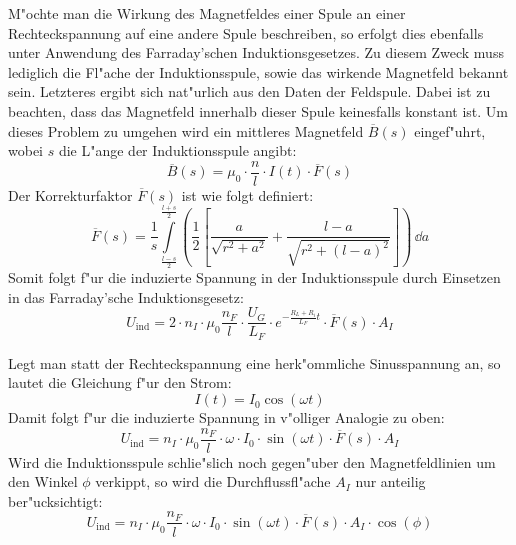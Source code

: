 \documentclass[a4paper,10pt]{article}
\begin{document}
M"ochte man die Wirkung des Magnetfeldes einer Spule an einer Rechteckspannung auf eine andere Spule beschreiben, so erfolgt dies ebenfalls unter Anwendung des Farraday'schen Induktionsgesetzes. Zu diesem Zweck muss lediglich die Fl"ache der Induktionsspule, sowie das wirkende Magnetfeld bekannt sein. Letzteres ergibt sich nat"urlich aus den Daten der Feldspule. Dabei ist zu beachten, dass das Magnetfeld innerhalb dieser Spule keinesfalls konstant ist. Um dieses Problem zu umgehen wird ein mittleres Magnetfeld $\overline{B}(s)$ eingef"uhrt, wobei $s$ die L"ange der Induktionsspule angibt:
\begin{equation}
\overline{B}(s) = \mu_0 \cdot \frac{n}{l} \cdot I(t) \cdot \overline{F}(s)
\end{equation}
Der Korrekturfaktor $\overline{F}(s)$ ist wie folgt definiert:
\begin{equation}
\overline{F}(s) = \frac{1}{s} \int \limits_{\frac{l-s}{2}}^{\frac{l+s}{2}} \left( \frac{1}{2} \left[ \frac{a}{\sqrt{r^2 + a^2}} + \frac{l- a}{\sqrt{r^2 + (l-a)^2}}\right]\right) \, \dd a
\end{equation}
Somit folgt f"ur die induzierte Spannung in der Induktionsspule durch Einsetzen in das Farraday'sche Induktionsgesetz:
\begin{equation}
U_\text{ind} = 2 \cdot n_I \cdot \mu_0 \frac{n_F}{l} \cdot \frac{U_G}{L_F} \cdot e^{- \frac{R_L + R_i}{L_F} t} \cdot \overline{F}(s)  \cdot A_I \label{Uind1}
\end{equation}

Legt man statt der Rechteckspannung eine herk"ommliche Sinusspannung an, so lautet die Gleichung f"ur den Strom:
\begin{equation}
I(t) = I_0 \cos(\omega t)
\end{equation}
Damit folgt f"ur die induzierte Spannung in v"olliger Analogie zu oben:
\begin{equation}
U_\text{ind} = n_I \cdot \mu_0 \frac{n_F}{l} \cdot \omega \cdot I_0 \cdot \sin(\omega t) \cdot \overline{F}(s)  \cdot A_I \label{UindSin}
\end{equation}
Wird die Induktionsspule schlie"slich noch gegen"uber den Magnetfeldlinien um den Winkel $\phi$ verkippt, so wird die Durchflussfl"ache $A_I$ nur anteilig ber"ucksichtigt:
\begin{equation}
U_\text{ind} = n_I \cdot \mu_0 \frac{n_F}{l} \cdot \omega \cdot I_0 \cdot \sin(\omega t) \cdot \overline{F}(s)  \cdot A_I \cdot \cos(\phi) \label{UindWinkel}
\end{equation}
\end{document}
